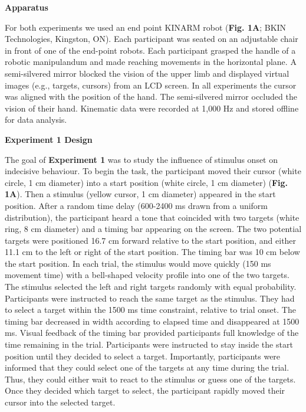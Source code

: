 \documentclass[12pt]{article}
\newcommand\boldblue[1]{\textcolor{mydarkblue}{\textbf{#1}}}
\begin{document}
\noindent\boldblue{Apparatus}

\noindent For both experiments we used an end point KINARM robot (\boldblue{Fig. 1A}; BKIN Technologies, Kingston, ON). Each participant was seated on an adjustable chair in front of one of the end-point robots. Each participant grasped the handle of a robotic manipulandum and made reaching movements in the horizontal plane. A semi-silvered mirror blocked the vision of the upper limb and displayed virtual images (e.g., targets, cursors) from an LCD screen. In all experiments the cursor was aligned with the position of the hand. The semi-silvered mirror occluded the vision of their hand. Kinematic data were recorded at 1,000 Hz and stored offline for data analysis.

\vspace{5mm}
\noindent\boldblue{\large Experiment 1 Design}

\noindent The goal of \boldblue{Experiment 1} was to study the influence of stimulus onset on indecisive behaviour. To begin the task, the participant moved their cursor (white circle, 1 cm diameter) into a start position (white circle, 1 cm diameter) (\boldblue{Fig. 1A}). Then a stimulus (yellow cursor, 1 cm diameter) appeared in the start position. After a random time delay (600-2400 ms drawn from a uniform distribution), the participant heard a tone that coincided with two targets (white ring, 8 cm diameter) and a timing bar appearing on the screen. The two potential targets were positioned 16.7 cm forward relative to the start position, and either 11.1 cm to the left or right of the start position. The timing bar was 10 cm below the start position. In each trial, the stimulus would move quickly (150 ms movement time) with a bell-shaped velocity profile into one of the two targets. The stimulus selected the left and right targets randomly with equal probability. Participants were instructed to reach the same target as the stimulus. They had to select a target within the 1500 ms time constraint, relative to trial onset. The timing bar decreased in width according to elapsed time and disappeared at 1500 ms. Visual feedback of the timing bar provided participants full knowledge of the time remaining in the trial. Participants were instructed to stay inside the start position until they decided to select a target.  Importantly, participants were informed that they could select one of the targets at any time during the trial. Thus, they could either wait to react to the stimulus or guess one of the targets. Once they decided which target to select, the participant rapidly moved their cursor into the selected target.
\end{document}
